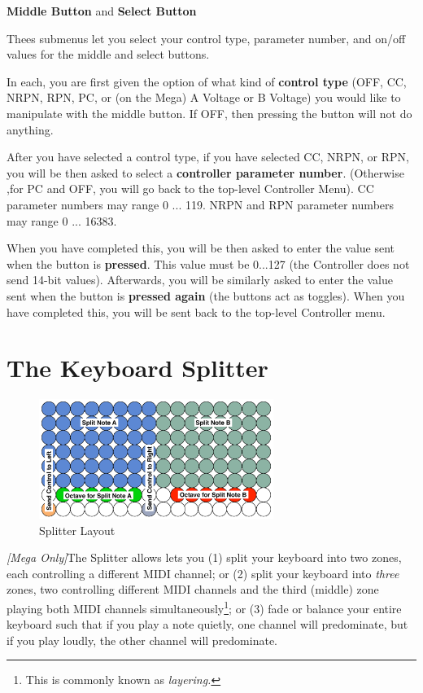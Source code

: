 \documentclass{article}
\begin{document}
\begin{description}
	\item{\bf Middle Button} and {\bf Select Button}
	
	Thees submenus let you select your control type, parameter number, and on/off values for the middle and select buttons.
	
	In each, you are first given the option of what kind of {\bf control type} (OFF, CC, NRPN, RPN, PC, or (on the Mega) A Voltage or B Voltage) you would like to manipulate with the middle button.  If OFF, then pressing the button will not do anything.

	After you have selected a control type, if you have selected CC, NRPN, or RPN, you will be then asked to select a {\bf controller parameter number}.  (Otherwise ,for PC and OFF, you will go back to the top-level Controller Menu).  CC parameter numbers may range 0 ... 119.  NRPN and RPN parameter numbers may range 0 ... 16383.
	
	When you have completed this, you will be then asked to enter the value sent when the button is {\bf pressed}.  This value must be 0...127 (the Controller does not send 14-bit values).  Afterwards, you will be similarly asked to enter the value sent when the button is {\bf pressed again} (the buttons act as toggles).  When you have completed this, you will be sent back to the top-level Controller menu.
	\end{description}

\clearpage

\section {The Keyboard Splitter}
\label{splitter}

\begin{figure}
\vspace{-4em}\includegraphics[width=3in]{split}
\vspace{-2em}\caption{\small Splitter Layout}
\label{splitter}
\end{figure}

\textit{[Mega Only]}\qquad The Splitter allows lets you (1) split your keyboard into two zones, each controlling a different MIDI channel; or (2) split your keyboard into {\it three} zones, two controlling different MIDI channels and the third (middle) zone playing both MIDI channels simultaneously\footnote{This is commonly known as {\it layering.}}; or (3) fade or balance your entire keyboard such that if you play a note quietly, one channel will predominate, but if you play loudly, the other channel will predominate.
\end{document}
